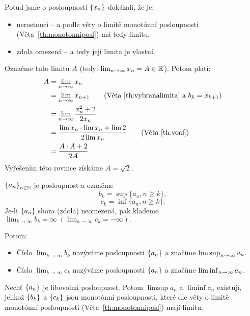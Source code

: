 \begin{remark}
    Potud jsme o posloupnosti $\left\{x_n\right\}$ dokázali, že je:
    \begin{itemize}
        \item nerostoucí -- a podle věty o limitě monotónní posloupnosti 
            (Věta~\ref{th:monotonniposl}) má tedy limitu,
        \item zdola omezená -- a tedy její limita je vlastní.
    \end{itemize}
    Označme tuto limitu $A$ (tedy: $\lim_{n\to\infty} x_n = A \in \mathbb{R}$). Potom platí:
    \begin{align*}
        A &= \lim_{\ntoinfty} x_{n} \\
          &= \lim_{\ntoinfty} x_{n+1} \tag{Věta~\ref{th:vybranalimita} a $b_k = x_{k+1}$}\\
          &= \lim_{\ntoinfty} \frac{x_n^2 + 2}{2x_n} \\
          &= \frac{\lim x_n \cdot \lim x_n + \lim 2}{2\lim x_n} 
        \tag{Věta~\ref{th:voal}} \\
        &= \frac{A\cdot A + 2}{2A}
    \end{align*}
    Vyřešením této rovnice získáme $A = \sqrt{2}.$
\end{remark}

\begin{definition}
    \Necht $\left\{a_n\right\}_{n\in\mathbb{N}}$ je posloupnost a označme 
    $$b_k = \sup\{a_n, n\geq k\},$$
    $$c_k = \inf\{a_n, n\geq k\}.$$
    Je-li $\left\{a_n\right\}$ shora (zdola) neomezená, pak klademe $\lim_{k \to\infty}
    b_k = \infty \; (\lim_{k \to \infty} c_k = -\infty).$

    Potom:
    \begin{itemize}
        \item Číslo $\lim_{k\to\infty} b_k$ nazýváme  posloupnosti
    $\left\{a_n\right\}$ a značíme $\lim\sup_{n\to\infty} a_n.$
        \item Číslo $\lim_{k\to\infty} c_k$ nazýváme  posloupnosti
    $\left\{a_n\right\}$ a značíme $\lim\inf_{n\to\infty} a_n.$
    \end{itemize}
\end{definition}

\begin{remark}
    Nechť $\left\{a_n\right\}$ je libovolná posloupnost. Potom $\limsup a_n$ a 
    $\liminf a_n$ existují, jelikož $\left\{b_k\right\}$ a $\left\{c_k\right\}$ jsou monotónní 
    posloupnosti, které dle věty o limitě monotónní posloupnosti 
    (Věta~\ref{th:monotonniposl}) mají limitu.
\end{remark}

